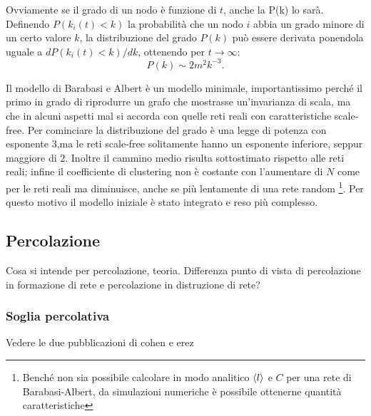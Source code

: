 Ovviamente se il grado di un nodo è funzione di $t$, anche la P(k) lo sarà. Definendo $P(k_i(t)<k)$ la probabilità che un nodo $i$ abbia un grado minore di un certo valore $k$, la distribuzione del grado $P(k)$ può essere derivata ponendola uguale a $dP(k_i(t)<k)/dk$, ottenendo per $t\rightarrow \infty$:
\[ P(k)\sim 2m^2 k^{-3}. \]

Il modello di Barabasi e Albert è un modello minimale, importantissimo perché il primo in grado di riprodurre un grafo che mostrasse un'invarianza di scala, ma che in alcuni aspetti mal si accorda con quelle reti reali con caratteristiche scale-free. Per cominciare la distribuzione del grado è una legge di potenza con esponente $3$,ma le reti scale-free solitamente hanno un esponente inferiore, seppur maggiore di $2$. Inoltre il cammino medio risulta sottostimato rispetto alle reti reali; infine il coefficiente di clustering non è costante con l'aumentare di $N$ come per le reti reali ma diminuisce, anche se più lentamente di una rete random \footnote{Benché non sia possibile calcolare in modo analitico $\braket{l}$ e $C$ per una rete di Barabasi-Albert, da simulazioni numeriche è possibile ottenerne quantità caratteristiche}. Per questo motivo il modello iniziale è stato integrato e reso più complesso.  


\subsection{Percolazione} 
Cosa si intende per percolazione, teoria. Differenza punto di vista di percolazione in formazione di rete e percolazione in distruzione di rete?

\subsubsection{Soglia percolativa} 
Vedere le due pubblicazioni di cohen e erez